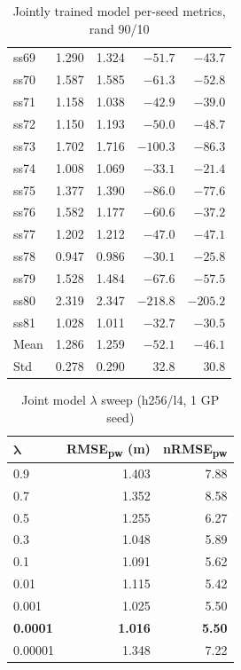 \begin{table}[htbp]
{\begin{tabular}{lrrrr}
ss69 & 1.290 & 1.324 & $-51.7$ & $-43.7$ \\
ss70 & 1.587 & 1.585 & $-61.3$ & $-52.8$ \\
ss71 & 1.158 & 1.038 & $-42.9$ & $-39.0$ \\
ss72 & 1.150 & 1.193 & $-50.0$ & $-48.7$ \\
ss73 & 1.702 & 1.716 & $-100.3$ & $-86.3$ \\
ss74 & 1.008 & 1.069 & $-33.1$ & $-21.4$ \\
ss75 & 1.377 & 1.390 & $-86.0$ & $-77.6$ \\
ss76 & 1.582 & 1.177 & $-60.6$ & $-37.2$ \\
ss77 & 1.202 & 1.212 & $-47.0$ & $-47.1$ \\
ss78 & 0.947 & 0.986 & $-30.1$ & $-25.8$ \\
ss79 & 1.528 & 1.484 & $-67.6$ & $-57.5$ \\
ss80 & 2.319 & 2.347 & $-218.8$ & $-205.2$ \\
ss81 & 1.028 & 1.011 & $-32.7$ & $-30.5$ \\
\midrule
Mean & 1.286 & 1.259 & $-52.1$ & $-46.1$ \\
Std  & 0.278 & 0.290 & 32.8    & 30.8 \\
\bottomrule
\end{tabular}}
\caption{Jointly trained model per-seed metrics, rand 90/10}
\label{tab:per_seed_joint}
\end{table}

\begin{table}[htbp]
\centering
\caption{Joint model $\lambda$ sweep (h256/l4, 1 GP seed)}
\label{tab:lambda_sweep}
\begin{tabular}{lrr}
\toprule
$\boldsymbol{\lambda}$ & \textbf{RMSE\textsubscript{pw} (m)} & \textbf{nRMSE\textsubscript{pw}} \\
\midrule
0.9    & 1.403 & 7.88 \\
0.7    & 1.352 & 8.58 \\
0.5    & 1.255 & 6.27 \\
0.3    & 1.048 & 5.89 \\
0.1    & 1.091 & 5.62 \\
0.01   & 1.115 & 5.42 \\
0.001  & 1.025 & 5.50 \\
\textbf{0.0001} & \textbf{1.016} & \textbf{5.50} \\
0.00001 & 1.348 & 7.22 \\
\bottomrule
\end{tabular}
\end{table}

